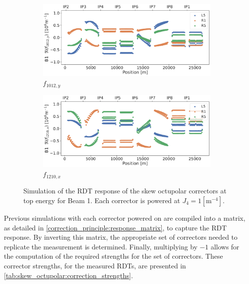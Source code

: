 \begin{figure}[!htb]
    \centering
    \begin{subfigure}{0.8\textwidth}
        \includegraphics[width=\textwidth]{./images/f1012_b1_correctors.pdf}
        \caption{$f_{1012,y}$}
    \end{subfigure}
    \par\bigskip 
    \begin{subfigure}{0.8\textwidth}
        \includegraphics[width=\textwidth]{./images/f1210_b1_correctors.pdf}
        \caption{$f_{1210,x}$}
    \end{subfigure}
    \caption{Simulation of the RDT response of the skew octupolar correctors at top energy for Beam
    1. Each corrector is powered at $J_4 = 1 [\text{m}^{-4}]$.}
    \label{fig:skew_octupolar:response_correctors}
\end{figure}


Previous simulations with each corrector powered on are compiled into a matrix, as detailed in
\cref{correction_principle:response_matrix}, to capture the RDT response. By inverting this
matrix, the appropriate set of correctors needed to replicate the measurement is determined.
Finally, multiplying by $-1$ allows for the computation of the required strengths for the set of
correctors. These corrector strengths, for the measured RDTs, are presented in
\cref{tab:skew_octupolar:correction_strengths}.

